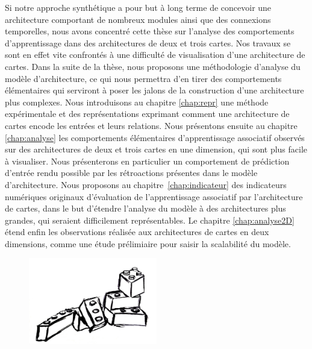 Si notre approche synthétique a pour but à long terme de concevoir une architecture comportant de nombreux modules ainsi que des connexions temporelles, nous avons concentré cette thèse sur l'analyse des comportements d'apprentissage dans des architectures de deux et trois cartes.
Nos travaux se sont en effet vite confrontés à une difficulté de visualisation d'une architecture de cartes.
Dans la suite de la thèse, nous proposons une méthodologie d'analyse du modèle d'architecture, ce qui nous permettra d'en tirer des comportements élémentaires qui serviront à poser les jalons de la construction d'une architecture plus complexes.
Nous introduisons au chapitre \ref{chap:repr} une méthode expérimentale et des représentations exprimant comment une architecture de cartes encode les entrées et leurs relations.
Nous présentons ensuite au chapitre \ref{chap:analyse} les comportements élémentaires d'apprentissage associatif observés sur des architectures de deux et trois cartes en une dimension, qui sont plus facile à visualiser. 
Nous présenterons en particulier un comportement de prédiction d'entrée rendu possible par les rétroactions présentes dans le modèle d'architecture.
Nous proposons au chapitre~\ref{chap:indicateur} des indicateurs numériques originaux d'évaluation de l'apprentissage associatif par l'architecture de cartes, dans le but d'étendre l'analyse du modèle à des architectures plus grandes, qui seraient difficilement représentables.
Le chapitre \ref{chap:analyse2D} étend enfin les observations réalisée aux architectures de cartes en deux dimensions, comme une étude prélimiaire pour saisir la scalabilité du modèle.

\begin{figure}[b]
    \centering\includegraphics[width=0.5\textwidth]{lego2.jpg}
\end{figure}





